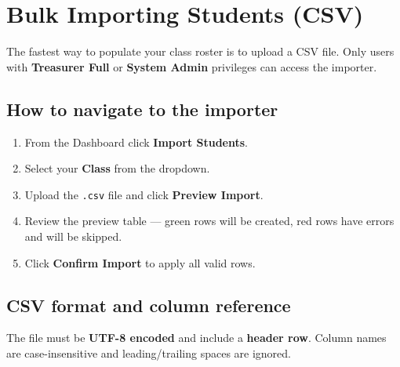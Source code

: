 \documentclass[a4paper,11pt]{article}
\begin{document}
\section{Bulk Importing Students (CSV)}
\label{sec:import}

The fastest way to populate your class roster is to upload a CSV file.
Only users with \textbf{Treasurer Full} or \textbf{System Admin} privileges
can access the importer.

\subsection{How to navigate to the importer}

\begin{enumerate}[noitemsep]
    \item From the Dashboard click \textbf{Import Students}.
    \item Select your \textbf{Class} from the dropdown.
    \item Upload the \texttt{.csv} file and click \textbf{Preview Import}.
    \item Review the preview table — green rows will be created,
          red rows have errors and will be skipped.
    \item Click \textbf{Confirm Import} to apply all valid rows.
\end{enumerate}

\subsection{CSV format and column reference}

The file must be \textbf{UTF-8 encoded} and include a \textbf{header row}.
Column names are case-insensitive and leading/trailing spaces are ignored.
\end{document}
